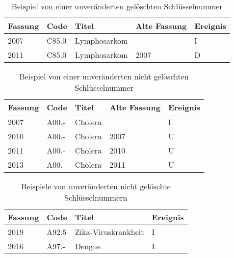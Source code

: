 \begin{table}[ht]
	\centering
	\small
	\caption[Unveränderte gelöschte Schlüsselnummer]{Beispiel von einer unveränderten gelöschten Schlüsselnummer}
	\label{tab:ID}
	\begin{tabular}{|l|l|p{6cm}|l|l|}
		\hline
		\rowcolor{lightgray} Fassung & Code & Titel & Alte Fassung & Ereignis \\ \hline
		2007 & C85.0 & Lymphosarkom &  & I \\ \hline
		2011 & C85.0 & Lymphosarkom & 2007 & D \\ \hline
	\end{tabular}
\end{table}

\begin{table}[ht]
	\centering
	\small
	\caption[Veränderte nicht gelöschte Schlüsselnummer]{Beispiel von einer unveränderten nicht gelöschten Schlüsselnummer}
	\label{tab:IU}
	\begin{tabular}{|l|l|p{6cm}|l|l|}
		\hline
		\rowcolor{lightgray} Fassung & Code & Titel & Alte Fassung & Ereignis \\ \hline
		2007 & A00.-  & Cholera &  & I\\ \hline
		2010 & A00.-  & Cholera & 2007 & U\\ \hline
		2011 & A00.-  & Cholera & 2010 & U\\ \hline                                                                                                                    
		2013 & A00.-  & Cholera & 2011 & U\\ \hline
	\end{tabular}
\end{table}

\begin{table}[ht]
	\centering
	\small
	\caption[Unveränderte nicht gelöschte Schlüsselnummer]{Beispiele von unveränderten nicht gelöschte Schlüsselnummern}
	\label{tab:I}
	\begin{tabular}{|l|l|p{6cm}|l|}
		\hline
		\rowcolor{lightgray} Fassung & Code & Titel & Ereignis \\ \hline
		2019 & A92.5 & Zika-Viruskrankheit & I \\ \hline                                                                                                         
		2016 & A97.- & Dengue & I \\ \hline
	\end{tabular}
\end{table}



